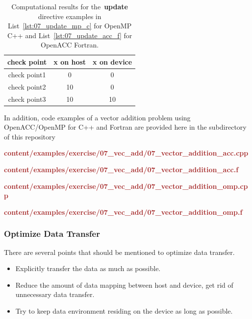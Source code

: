 \begin{table}[!h]
\centering\caption{Computational results for the~\textbf{update} directive examples in List~\ref{lst:07_update_mp_c} for OpenMP C++ and List~\ref{lst:07_update_acc_f} for OpenACC Fortran.}\label{tbl:solution_update_directive}
\begin{tabular}{ |  c  |  c  |  c  | } 
\hline
check point & x on host & x on device \\
\hline
check point1 & 0 & 0 \\
check point2 & 10 & 0 \\
check point3 & 10 & 10 \\
\hline
\end{tabular}
\end{table}


\par
In addition, code examples of a vector addition problem using OpenACC/OpenMP for C++ and Fortran are provided here in the subdirectory of this repository~\cite{gpu-programming-examples}

\textbf{\textcolor{brown}{content/examples/exercise/07\_vec\_add/07\_vector\_addition\_acc.cpp}}

\textbf{\textcolor{brown}{content/examples/exercise/07\_vec\_add/07\_vector\_addition\_acc.f}}

\textbf{\textcolor{brown}{content/examples/exercise/07\_vec\_add/07\_vector\_addition\_omp.cpp}}

\textbf{\textcolor{brown}{content/examples/exercise/07\_vec\_add/07\_vector\_addition\_omp.f}}




\subsubsection{Optimize Data Transfer}


\par
There are several points that should be mentioned to optimize data transfer.
\begin{itemize}
    \item Explicitly transfer the data as much as possible.
    \item Reduce the amount of data mapping between host and device, get rid of unnecessary data transfer.
    \item Try to keep data environment residing on the device as long as possible.
\end{itemize}




